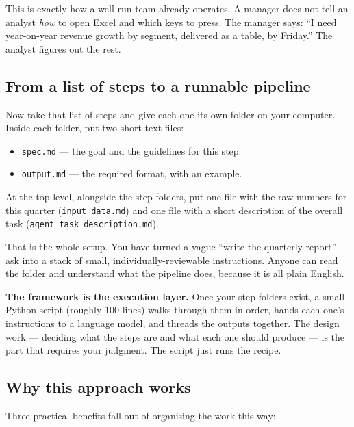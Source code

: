 \documentclass[12pt, a4paper]{article}
\begin{document}
This is exactly how a well-run team already operates. A manager does not tell an analyst \textit{how} to open Excel and which keys to press. The manager says: ``I need year-on-year revenue growth by segment, delivered as a table, by Friday.'' The analyst figures out the rest.

\subsection{From a list of steps to a runnable pipeline}

Now take that list of steps and give each one its own folder on your computer. Inside each folder, put two short text files:

\begin{itemize}[leftmargin=1.5em]
  \item \texttt{spec.md} --- the goal and the guidelines for this step.
  \item \texttt{output.md} --- the required format, with an example.
\end{itemize}

At the top level, alongside the step folders, put one file with the raw numbers for this quarter (\texttt{input\_data.md}) and one file with a short description of the overall task (\texttt{agent\_task\_description.md}).

That is the whole setup. You have turned a vague ``write the quarterly report'' ask into a stack of small, individually-reviewable instructions. Anyone can read the folder and understand what the pipeline does, because it is all plain English.

\begin{notebox}
\textbf{The framework is the execution layer.} Once your step folders exist, a small Python script (roughly 100 lines) walks through them in order, hands each one's instructions to a language model, and threads the outputs together. The design work --- deciding what the steps are and what each one should produce --- is the part that requires your judgment. The script just runs the recipe.
\end{notebox}

\subsection{Why this approach works}

Three practical benefits fall out of organising the work this way:
\end{document}
